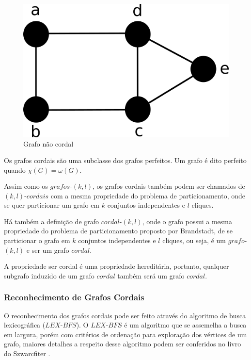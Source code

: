 \begin{figure}
    \centering
    \includegraphics[scale=0.4]{pictures/non_chordal_1.png}
    \caption{Grafo não cordal}
    \label{fig:no_chordal}
\end{figure}

Os grafos cordais são uma subclasse dos grafos perfeitos. Um grafo é dito perfeito quando $\chi(G) = \omega(G)$.

Assim como os $grafos$-$(k,l)$, os grafos cordais também podem ser chamados de $(k,l)$-$cordais$ com a mesma propriedade do problema de particionamento, onde se quer particionar um grafo em $k$ conjuntos independentes e $l$ cliques. 


Há também a definição de grafo $cordal$-$(k,l)$, onde o grafo possui a mesma propriedade do problema de particionamento proposto por Brandstadt, de se particionar o grafo em $k$ conjuntos independentes e $l$ cliques, ou seja, é um $grafo$-$(k,l)$ e ser um grafo $cordal$.

A propriedade ser cordal é uma propriedade hereditária, portanto, qualquer subgrafo induzido de um grafo $cordal$ também será um grafo $cordal$.

\subsubsection{Reconhecimento de Grafos Cordais}

O reconhecimento dos grafos cordais pode ser feito através do algoritmo de busca lexicográfica ($LEX$-$BFS$). O $LEX$-$BFS$ é um algoritmo que se assemelha a busca em largura, porém com critérios de ordenação para exploração dos vértices de um grafo, maiores detalhes a respeito desse algoritmo podem ser conferidos no livro do Szwarcfiter \cite{JaymeGrafosNovo}.

